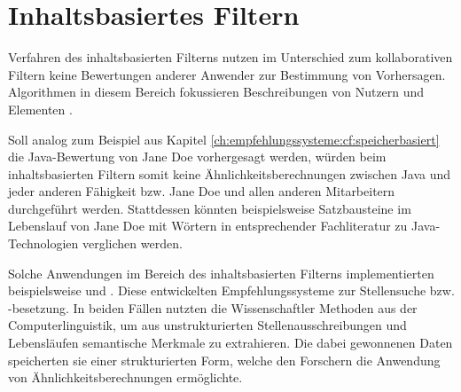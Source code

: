 \section{Inhaltsbasiertes Filtern}
\label{ch:empfehlungssysteme:inhaltsbasiertesFiltern}
Verfahren des inhaltsbasierten Filterns nutzen im Unterschied zum kollaborativen Filtern keine Bewertungen anderer Anwender zur Bestimmung von Vorhersagen. Algorithmen in diesem Bereich fokussieren Beschreibungen von Nutzern und Elementen \cite[S. 139f.]{recommenderSystems:2016}.

Soll analog zum Beispiel aus Kapitel \ref{ch:empfehlungssysteme:cf:speicherbasiert} die Java-Bewertung von Jane Doe vorhergesagt werden, würden beim inhaltsbasierten Filtern somit keine Ähnlichkeitsberechnungen zwischen Java und jeder anderen Fähigkeit bzw. Jane Doe und allen anderen Mitarbeitern durchgeführt werden. Stattdessen könnten beispielsweise Satzbausteine im Lebenslauf von Jane Doe mit Wörtern in entsprechender Fachliteratur zu Java-Technologien verglichen werden.

Solche Anwendungen im Bereich des inhaltsbasierten Filterns implementierten beispielsweise \textcite[S. 4ff.]{guo:2016} und \textcite[S. 3ff.]{prospect:2010}. Diese entwickelten Empfehlungssysteme zur Stellensuche bzw. -besetzung. In beiden Fällen nutzten die Wissenschaftler Methoden aus der Computerlinguistik, um aus unstrukturierten Stellenausschreibungen und Lebensläufen semantische Merkmale zu extrahieren. Die dabei gewonnenen Daten speicherten sie einer strukturierten Form, welche den Forschern die Anwendung von Ähnlichkeitsberechnungen ermöglichte.%

